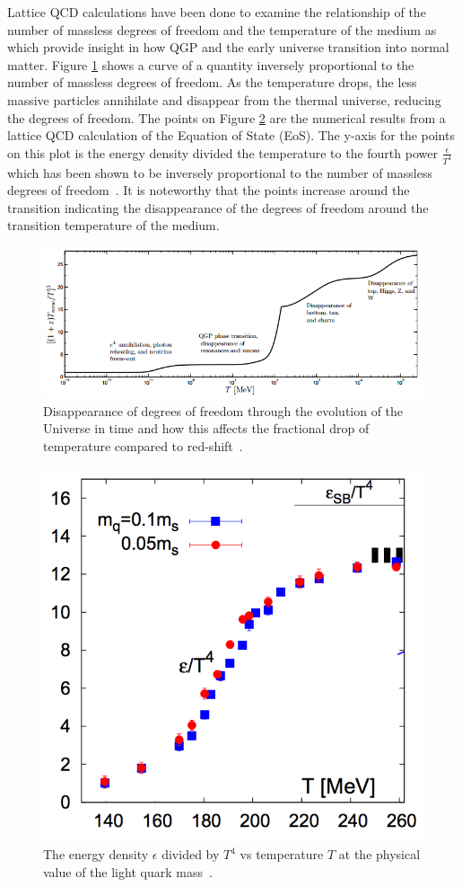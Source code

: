 Lattice QCD calculations have been done to examine the relationship of the number of massless degrees of freedom and the temperature of the medium as which provide insight in how QGP and the early universe transition into normal matter. Figure \ref{fig:lattice_degrees} shows a curve of a quantity inversely proportional to the number of massless degrees of freedom. As the temperature drops, the less massive particles annihilate and disappear from the thermal universe, reducing the degrees of freedom. The points on Figure \ref{fig:lattice_degrees_calc} are the numerical results from a lattice QCD calculation of the Equation of State (EoS). The y-axis for the points on this plot is the energy density divided the temperature to the fourth power $\frac{\epsilon}{T^4}$ which has been shown to be inversely proportional to the number of massless degrees of freedom~\cite{PhysRevD.81.054504}. It is noteworthy that the points increase around the transition indicating the disappearance of the degrees of freedom around the transition temperature of the medium.

\begin{figure}[!ht]
\begin{center}
\includegraphics[width=0.55\linewidth]{figs/lattice_degrees_plot.PNG}
\caption{Disappearance of degrees of freedom through the evolution of the Universe in time
and how this affects the fractional drop of temperature compared to red-shift~\cite{1742-6596-509-1-012014}.}
\end{center}
\label{fig:lattice_degrees}
\end{figure}

\begin{figure}[!ht]
\begin{center}
\includegraphics[width=0.55\linewidth]{figs/lattice_degrees_calculation.png}
\caption{The energy density $\epsilon$ divided by $T^4$ vs temperature $T$ at the physical value of the light quark mass~\cite{PhysRevD.81.054504}.}
\end{center}
\label{fig:lattice_degrees_calc}
\end{figure}

